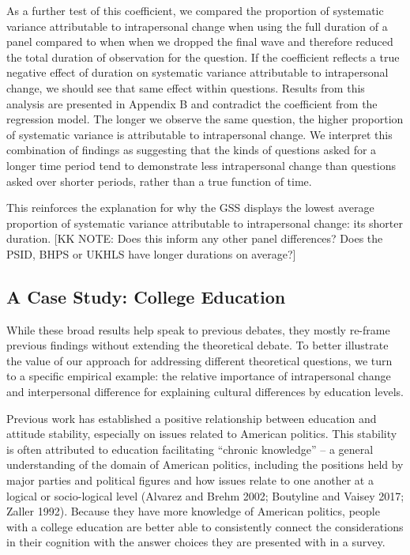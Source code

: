 \documentclass[
  11pt,
]{article}
\begin{document}
As a further test of this coefficient, we compared the proportion of
systematic variance attributable to intrapersonal change when using the
full duration of a panel compared to when when we dropped the final wave
and therefore reduced the total duration of observation for the
question. If the coefficient reflects a true negative effect of duration
on systematic variance attributable to intrapersonal change, we should
see that same effect within questions. Results from this analysis are
presented in Appendix B and contradict the coefficient from the
regression model. The longer we observe the same question, the higher
proportion of systematic variance is attributable to intrapersonal
change. We interpret this combination of findings as suggesting that the
kinds of questions asked for a longer time period tend to demonstrate
less intrapersonal change than questions asked over shorter periods,
rather than a true function of time.

This reinforces the explanation for why the GSS displays the lowest
average proportion of systematic variance attributable to intrapersonal
change: its shorter duration. {[}KK NOTE: Does this inform any other
panel differences? Does the PSID, BHPS or UKHLS have longer durations on
average?{]}

\hypertarget{a-case-study-college-education}{%
\subsection{A Case Study: College
Education}\label{a-case-study-college-education}}

While these broad results help speak to previous debates, they mostly
re-frame previous findings without extending the theoretical debate. To
better illustrate the value of our approach for addressing different
theoretical questions, we turn to a specific empirical example: the
relative importance of intrapersonal change and interpersonal difference
for explaining cultural differences by education levels.

Previous work has established a positive relationship between education
and attitude stability, especially on issues related to American
politics. This stability is often attributed to education facilitating
``chronic knowledge'' -- a general understanding of the domain of
American politics, including the positions held by major parties and
political figures and how issues relate to one another at a logical or
socio-logical level (Alvarez and Brehm 2002; Boutyline and Vaisey 2017;
Zaller 1992). Because they have more knowledge of American politics,
people with a college education are better able to consistently connect
the considerations in their cognition with the answer choices they are
presented with in a survey.
\end{document}

